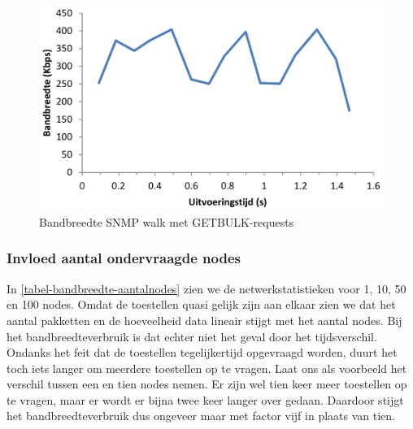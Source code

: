 \begin{figure}[h]
	\centering
	\includegraphics[scale=0.40]{figures/bandbreedte/snmpbulkwalk}
	\caption{Bandbreedte SNMP walk met GETBULK-requests}
	\label{fig-bandbreedte-bulkwalk}
\end{figure}


\subsubsection{Invloed aantal ondervraagde nodes}

In \cref{tabel-bandbreedte-aantalnodes} zien we de netwerkstatistieken voor 1, 10, 50 en 100 nodes.
Omdat de toestellen quasi gelijk zijn aan elkaar zien we dat het aantal pakketten en de hoeveelheid data lineair stijgt met het aantal nodes.
Bij het bandbreedteverbruik is dat echter niet het geval door het tijdsverschil.
Ondanks het feit dat de toestellen tegelijkertijd opgevraagd worden, duurt het toch iets langer om meerdere toestellen op te vragen.
Laat ons als voorbeeld het verschil tussen een en tien nodes nemen.
Er zijn wel tien keer meer toestellen op te vragen, maar er wordt er bijna twee keer langer over gedaan.
Daardoor stijgt het bandbreedteverbruik dus ongeveer maar met factor vijf in plaats van tien.

